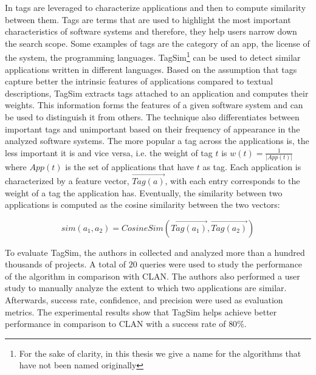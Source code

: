 In \cite{Lo:2012:DSA:2473496.2473616} tags are leveraged to characterize applications and then to compute similarity between them. Tags are terms that are used to highlight the most important characteristics of software systems \cite{xia:tag:2013} and therefore, they help users narrow down the search scope. Some examples of tags are the category of an app, the license of the system, the programming languages. TagSim\footnote{For the sake of clarity, in this thesis we give a name for the algorithms that have not been named originally} can be used to detect similar applications written in different languages. Based on the assumption that tags capture better the intrinsic features of applications compared to textual descriptions, TagSim extracts tags attached to an application and computes their weights. This information forms the features of a given software system and can be used to distinguish it from others. The technique also differentiates between important tags and unimportant based on their frequency of appearance in the analyzed software systems. The more popular a tag across the applications is, the less important it is and vice versa, i.e. the weight of tag $t$ is $w(t) = \frac{1}{|App(t)|}$ where $App(t)$ is the set of applications that have $t$ as tag. Each application is characterized by a feature vector, $\vec{Tag(a)}$, with each entry corresponds to the weight of a tag the application has. Eventually, the similarity between two applications is computed as the cosine similarity between the two vectors:

\begin{equation}
sim(a_{1},a_{2})= CosineSim(\vec{Tag(a_{1})},\vec{Tag(a_{2})})
\end{equation}

To evaluate TagSim, the authors in \cite{Lo:2012:DSA:2473496.2473616} collected and analyzed more than a hundred thousands of projects. A total of $20$ queries were used to study the performance of the algorithm in comparison with CLAN. The authors also performed a user study to manually analyze the extent to which two applications are similar. Afterwards, success rate, confidence, and precision were used as evaluation metrics. The experimental results show that TagSim helps achieve better performance in comparison to CLAN with a success rate of $80\%$.

